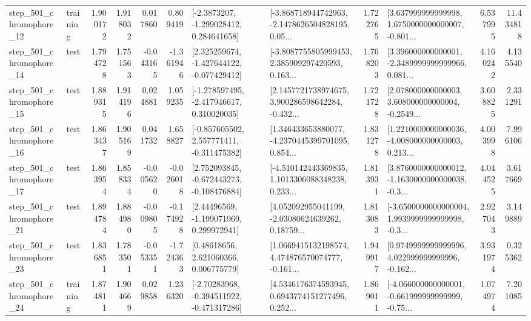 \begin{tabular}{llrrrrllrlrr}
  step\_501\_chromophore\_12 &  training &      1.900172 &    1.918032 &      0.017860 &  0.809419 &     [-2.3873207, -1.299028412, 0.284641658] &  [-3.868718944742963, -2.1478626504828195, 0.05... &       1.722765 &  [3.637999999999998, 1.6750000000000007, -0.801... &            6.537995 &         11.434818 \\
  step\_501\_chromophore\_14 &      test &      1.794728 &    1.751563 &     -0.043165 & -1.361946 &   [2.325259674, -1.427644122, -0.077429412] &  [-3.8087755805999453, 2.385909297420593, 0.163... &       1.768203 &  [3.396000000000001, -2.3489999999999966, 0.081... &            4.160242 &          4.135540 \\
  step\_501\_chromophore\_15 &      test &      1.889315 &    1.914196 &      0.024881 &  1.059235 &   [-1.278597495, -2.417946617, 0.310020035] &  [2.1457721738974675, 3.900286598642284, -0.432... &       1.721728 &  [2.078000000000003, 3.608000000000004, -0.2549... &            3.608825 &          2.331291 \\
  step\_501\_chromophore\_16 &      test &      1.863437 &    1.905169 &      0.041732 &  1.658827 &   [-0.857605502, 2.557771411, -0.311475382] &  [1.346433653880077, -4.2370445399701095, 0.854... &       1.831278 &  [1.2210000000000036, -4.008000000000003, 0.213... &            4.003998 &          7.996106 \\
  step\_501\_chromophore\_17 &      test &      1.863954 &    1.858334 &     -0.005620 & -0.026018 &   [2.752093845, -0.672443273, -0.108476884] &  [-4.510142443369835, 1.1013306088348238, 0.233... &       1.813931 &  [3.8760000000000012, -1.1630000000000038, -0.3... &            4.044525 &          3.617669 \\
  step\_501\_chromophore\_21 &      test &      1.894784 &    1.884980 &     -0.009805 & -0.174928 &     [2.44496569, -1.199071969, 0.299972941] &  [4.052092955041199, -2.03080624639262, 0.18759... &       1.813083 &  [-3.6500000000000004, 1.9939999999999998, -0.3... &            2.927043 &          3.149889 \\
  step\_501\_chromophore\_23 &      test &      1.836851 &    1.783501 &     -0.053351 & -1.724363 &      [0.48618656, 2.621060366, 0.006775779] &  [1.0669415132198574, 4.474876570074777, -0.161... &       1.949917 &  [0.9749999999999996, 4.022999999999996, -0.162... &            3.931974 &          0.325362 \\
  step\_501\_chromophore\_24 &  training &      1.874811 &    1.904669 &      0.029858 &  1.236320 &   [-2.70283968, -0.394511922, -0.471317286] &  [4.5346176374593945, 0.6943774151277496, 0.252... &       1.869011 &  [-4.066000000000001, -0.661999999999999, -0.75... &            1.074974 &          7.201085 \\

\end{tabular}
